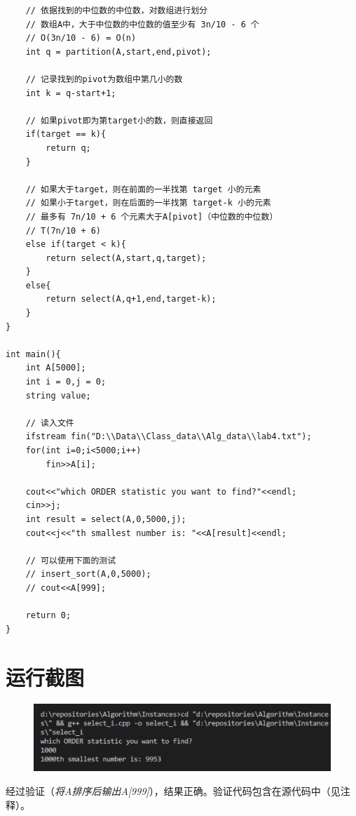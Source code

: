 \documentclass{ctexart}[UTF8]
\begin{document}
\begin{lstlisting}
    // 依据找到的中位数的中位数，对数组进行划分
    // 数组A中，大于中位数的中位数的值至少有 3n/10 - 6 个
    // O(3n/10 - 6) = O(n)
    int q = partition(A,start,end,pivot);

    // 记录找到的pivot为数组中第几小的数
    int k = q-start+1;

    // 如果pivot即为第target小的数，则直接返回
    if(target == k){
        return q;
    }

    // 如果大于target，则在前面的一半找第 target 小的元素
    // 如果小于target，则在后面的一半找第 target-k 小的元素
    // 最多有 7n/10 + 6 个元素大于A[pivot]（中位数的中位数）
    // T(7n/10 + 6)
    else if(target < k){
        return select(A,start,q,target);
    }
    else{
        return select(A,q+1,end,target-k);
    }
}

int main(){
    int A[5000];
    int i = 0,j = 0;
    string value;

    // 读入文件
    ifstream fin("D:\\Data\\Class_data\\Alg_data\\lab4.txt");
    for(int i=0;i<5000;i++)
		fin>>A[i];

    cout<<"which ORDER statistic you want to find?"<<endl;
    cin>>j;
    int result = select(A,0,5000,j);
    cout<<j<<"th smallest number is: "<<A[result]<<endl;

    // 可以使用下面的测试
    // insert_sort(A,0,5000);
    // cout<<A[999];
    
    return 0;
}
    \end{lstlisting}
    \section{运行截图}
        \begin{figure}[H]
            \centering
            \includegraphics[width=12cm]{resources/6_1.png}
        \end{figure}
    经过验证（\emph{将A排序后输出A[999]}），结果正确。验证代码包含在源代码中（见注释）。
 
\end{document}
